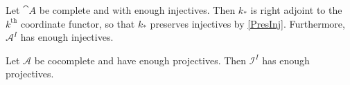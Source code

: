 \begin{exercise}
	Let $\cat{A}$ be complete and with enough injectives.
	Then $k_*$ is right adjoint to the $k^\text{th}$ coordinate functor, so that $k_*$ preserves injectives by \ref{PresInj}.
	Furthermore, $\mathcal{A}^I$ has enough injectives.
\end{exercise}

\begin{exercise}
	Let $\mathcal{A}$ be cocomplete and have enough projectives.
	Then $\mathcal{I}^I$ has enough projectives.
\end{exercise}